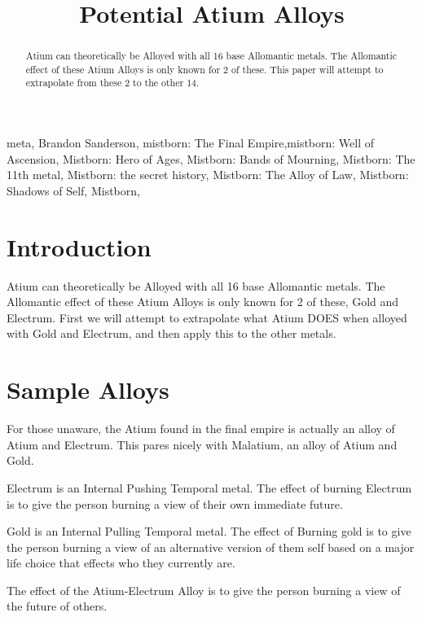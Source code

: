 \documentclass[conference]{IEEEtran}
\begin{document}
\title{Potential Atium Alloys}

\author{
}

\maketitle

\begin{abstract}
Atium can theoretically be Alloyed with all 16 base Allomantic metals.  The Allomantic effect of these Atium Alloys is only known for 2 of these.  This paper will attempt to extrapolate from these 2 to the other 14.
\end{abstract}

\begin{IEEEkeywords}
meta, Brandon Sanderson, mistborn: The Final Empire,mistborn: Well of Ascension, Mistborn: Hero of Ages, Mistborn: Bands of Mourning, Mistborn: The 11th metal, Mistborn: the secret history, Mistborn: The Alloy of Law, Mistborn: Shadows of Self, Mistborn, 
\end{IEEEkeywords}

\section*{Introduction}
Atium can theoretically be Alloyed with all 16 base Allomantic metals.  The Allomantic effect of these Atium Alloys is only known for 2 of these, Gold and Electrum.  First we will attempt to extrapolate what Atium DOES when alloyed with Gold and Electrum, and then apply this to the other metals.
\section*{Sample Alloys}
For those unaware, the Atium found in the final empire is actually an alloy of Atium and Electrum.  This pares nicely with Malatium, an alloy of Atium and Gold.

Electrum is an Internal Pushing Temporal metal.  The effect of burning Electrum is to give the person burning a view of their own immediate future.

Gold is an Internal Pulling Temporal metal.  The effect of Burning gold is to give the person burning a view of an alternative version of them self based on a major life choice that effects who they currently are.

The effect of the Atium-Electrum Alloy is to give the person burning a view of the future of others.
\end{document}
